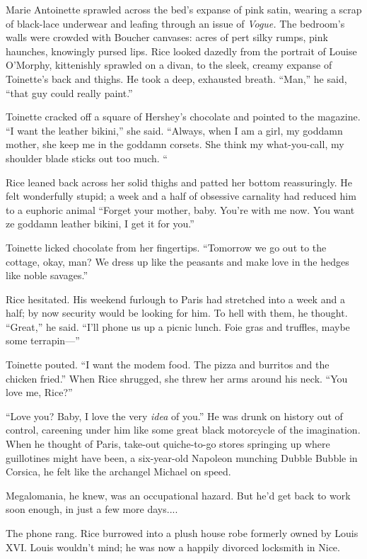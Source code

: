 Marie Antoinette sprawled across the bed's expanse of pink satin, wearing a scrap of black-lace underwear and leafing through an issue of \textit{Vogue.} The bedroom's walls were crowded with Boucher canvases: acres of pert silky rumps, pink haunches, knowingly pursed lips. Rice looked dazedly from the portrait of Louise O'Morphy, kittenishly sprawled on a divan, to the sleek, creamy expanse of Toinette's back and thighs. He took a deep, exhausted breath. ``Man,'' he said, ``that guy could really paint.''

Toinette cracked off a square of Hershey's chocolate and pointed to the magazine. ``I want the leather bikini,'' she said. ``Always, when I am a girl, my goddamn mother, she keep me in the goddamn corsets. She think my what-you-call, my shoulder blade sticks out too much. ``

Rice leaned back across her solid thighs and patted her bottom reassuringly. He felt wonderfully stupid; a week and a half of obsessive carnality had reduced him to a euphoric animal ``Forget your mother, baby. You're with me now. You want ze goddamn leather bikini, I get it for you.''

Toinette licked chocolate from her fingertips. ``Tomorrow we go out to the cottage, okay, man? We dress up like the peasants and make love in the hedges like noble savages.''

Rice hesitated. His weekend furlough to Paris had stretched into a week and a half; by now security would be looking for him. To hell with them, he thought. ``Great,'' he said. ``I'll phone us up a picnic lunch. Foie gras and truffles, maybe some terrapin—''

Toinette pouted. ``I want the modem food. The pizza and burritos and the chicken fried.'' When Rice shrugged, she threw her arms around his neck. ``You love me, Rice?''

``Love you? Baby, I love the very \textit{idea} of you.'' He was drunk on history out of control, careening under him like some great black motorcycle of the imagination. When he thought of Paris, take-out quiche-to-go stores springing up where guillotines might have been, a six-year-old Napoleon munching Dubble Bubble in Corsica, he felt like the archangel Michael on speed.

Megalomania, he knew, was an occupational hazard. But he'd get back to work soon enough, in just a few more days....

The phone rang. Rice burrowed into a plush house robe formerly owned by Louis XVI. Louis wouldn't mind; he was now a happily divorced locksmith in Nice.

